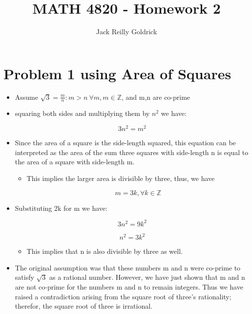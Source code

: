 \documentclass[]{report}
\title{MATH 4820 - Homework 2}
\author{Jack Reilly Goldrick}
\begin{document}
	\maketitle
	
	
\section{Problem 1 using Area of Squares}
	
	\begin{itemize}
		\item Assume $\sqrt{3} = \frac{m}{n} : m > n \ \forall m,m \in \mathbb{Z}$, and m,n are co-prime
		
		\item squaring both sides and multiplying them by $n^2$ we have:
		
						$$ 3n^2 = m^2 $$
						
						
		\item Since the area of a square is the side-length squared, this equation can be interpreted as the area of the sum three squares with side-length n is equal to the area of a square with side-length m. 
		
			\begin{itemize}
				\item This implies the larger area is divisible by three, thus, we have
				
				$$ m = 3k, \forall k \in \mathbb{Z} $$
				
			\end{itemize}
			
			
			
			
			\item Substituting 2k for m we have:
			
			$$ 3n^2 = 9k^2 $$
			
			$$ n^2 = 3k^2 $$
			
			
			\begin{itemize}
				
				\item This implies that n is also divisible by three as well.
				
		\end{itemize}
		
		
		\item The original assumption was that these numbers m and n were co-prime to satisfy $\sqrt{3}$ as a rational number.  However, we have just shown that m and n are not co-prime for the numbers m and n to remain integers.  Thus we have raised a contradiction arising from the square root of three's rationality; therefor, the square root of three is irrational.   
	\end{itemize}
	
\end{document}
